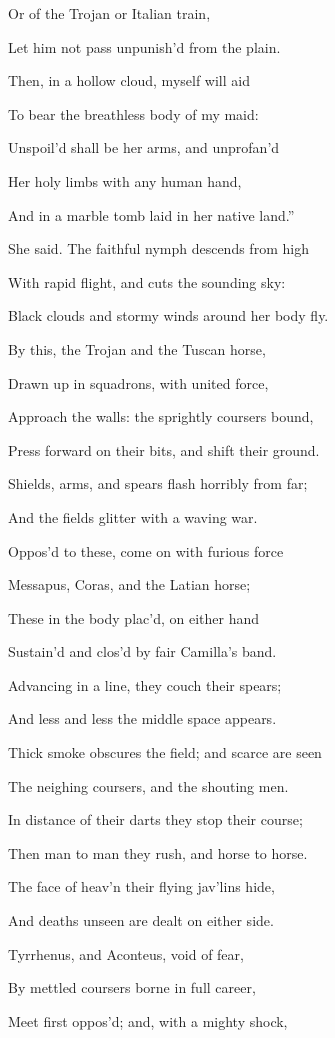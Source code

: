 Or of the Trojan or Italian train,

Let him not pass unpunish’d from the plain.

Then, in a hollow cloud, myself will aid

To bear the breathless body of my maid:

Unspoil’d shall be her arms, and unprofan’d

Her holy limbs with any human hand,

And in a marble tomb laid in her native land.”

She said. The faithful nymph descends from high

With rapid flight, and cuts the sounding sky:

Black clouds and stormy winds around her body fly.

By this, the Trojan and the Tuscan horse,

Drawn up in squadrons, with united force,

Approach the walls: the sprightly coursers bound,

Press forward on their bits, and shift their ground.

Shields, arms, and spears flash horribly from far;

And the fields glitter with a waving war.

Oppos’d to these, come on with furious force

Messapus, Coras, and the Latian horse;

These in the body plac’d, on either hand

Sustain’d and clos’d by fair Camilla’s band.

Advancing in a line, they couch their spears;

And less and less the middle space appears.

Thick smoke obscures the field; and scarce are seen

The neighing coursers, and the shouting men.

In distance of their darts they stop their course;

Then man to man they rush, and horse to horse.

The face of heav’n their flying jav’lins hide,

And deaths unseen are dealt on either side.

Tyrrhenus, and Aconteus, void of fear,

By mettled coursers borne in full career,

Meet first oppos’d; and, with a mighty shock,

